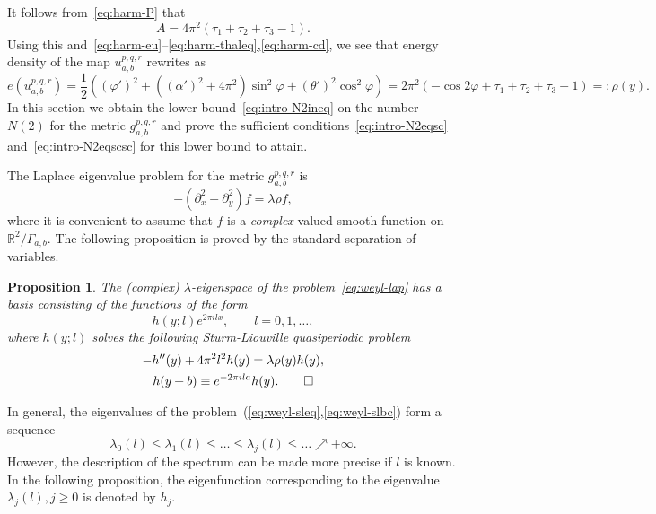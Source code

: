 \documentclass{amsart}
\let\le\leqslant
\let\ge\geqslant
\let\phi\varphi
\theoremstyle{plain}
\newtheorem{proposition}{Proposition}[section]
\theoremstyle{definition}
\theoremstyle{remark}
\begin{document}
It follows from~\eqref{eq:harm-P} that
\begin{equation}\label{eq:weyl-A}
A=4\pi^2(\tau_1+\tau_2+\tau_3-1).
\end{equation}
Using this and~\eqref{eq:harm-eu}--\eqref{eq:harm-thaleq},\eqref{eq:harm-cd}, we
see that energy density of the map \(u_{a,b}^{p,q,r}\) rewrites as
\[
e(u_{a,b}^{p,q,r})=\frac{1}2((\phi')^2+((\alpha')^2+4\pi^2)\sin^2\phi+
(\theta')^2\cos^2\phi)=
2\pi^2(-\cos 2\phi+\tau_1+\tau_2+\tau_3-1)=:\rho(y).
\]
In this section we obtain the lower bound~\eqref{eq:intro-N2ineq} on the number
\(N(2)\) for the metric \(g_{a,b}^{p,q,r}\) and prove the sufficient
conditions~\eqref{eq:intro-N2eqsc} and~\eqref{eq:intro-N2eqscsc} for this lower
bound to attain.

The Laplace eigenvalue problem for the metric \(g_{a,b}^{p,q,r}\) is
\begin{equation}\label{eq:weyl-lap}
-(\partial_x^2+\partial_y^2)f=\lambda\rho f,
\end{equation}
where it is convenient to assume that \(f\) is a \emph{complex} valued smooth
function on \(\mathbb R^2/\Gamma_{a,b}\). The following proposition is proved by
the standard separation of variables.

\begin{proposition}\label{pr:weyl-sep}
The (complex) \(\lambda\)-eigenspace of the problem~\eqref{eq:weyl-lap} has a
basis consisting of the functions of the form
\begin{equation}\label{eq:weyl-eigenfun}
h(y;l)e^{2\pi ilx},\qquad l=0,1,\ldots,
\end{equation}
where \(h(y;l)\) solves the following Sturm-Liouville quasiperiodic problem
\begin{gather}
-h''(y)+4\pi^2 l^2 h(y)=\lambda\rho(y)h(y),\label{eq:weyl-sleq}\\
h(y+b)\equiv e^{-2\pi ila}h(y).\qed\label{eq:weyl-slbc}
\end{gather}
\end{proposition}

In general, the eigenvalues of the
problem~(\ref{eq:weyl-sleq},\ref{eq:weyl-slbc}) form a sequence
\[
\lambda_0(l)\le\lambda_1(l)\le\ldots\le\lambda_j(l)\le\ldots\nearrow +\infty.
\]
However, the description of the spectrum can be made more precise if \(l\) is
known. In the following proposition, the eigenfunction corresponding to the
eigenvalue \(\lambda_j(l),j\ge 0\) is denoted by \(h_j\).
\end{document}
